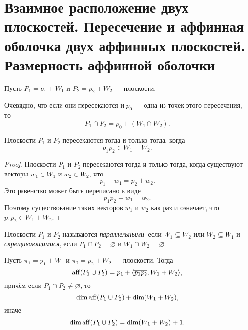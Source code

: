 \section{Взаимное расположение двух плоскостей. Пересечение и аффинная оболочка двух
аффинных плоскостей. Размерность аффинной оболочки}

Пусть $P_1 = p_1 + W_1$ и $P_2 = p_2 + W_2$ --- плоскости.

Очевидно, что если они пересекаются и $p_0$ --- одна из точек этого пересечения, то
\[
    P_1 \cap P_2 = p_0 + (W_1 \cap W_2).
\]

\begin{theorem}
    Плоскости $P_1$ и $P_2$ пересекаются тогда и только тогда, когда
    \[
        \overline{p_1p_2} \in W_1 + W_2.
    \]
\end{theorem}

\begin{proof}
    Плоскости $P_1$ и $P_2$ пересекаются тогда и только тогда, когда существуют векторы $w_1 \in W_1$ и $w_2 \in W_2$, что
    \[
        p_1 + w_1 = p_2 + w_2.
    \]
    Это равенство может быть переписано в виде
    \[
        \overline{p_1p_2} = w_1 - w_2.
    \]
    Поэтому существование таких векторов $w_1$ и $w_2$ как раз и означает, что $\overline{p_1p_2} \in W_1 + W_2$.
\end{proof}

\begin{definition}
    Плоскости $P_1$ и $P_2$ называются \textit{параллельными}, если $W_1 \subseteq W_2$ или $W_2 \subseteq W_1$ и \textit{скрещивающимися}, если $P_1 \cap P_2 = \varnothing$ и $W_1 \cap W_2 = \varnothing$.
\end{definition}

\begin{theorem}
    Пусть $\pi_1 = p_1 + W_1$ и $\pi_2 = p_2 + W_2$ --- плоскости. Тогда
    \[
        \operatorname{aff}(P_1 \cup P_2) = p_1 + \langle\overline{p_1p_2}, W_1 + W_2\rangle,
    \]
    причём если $P_1 \cap P_2 \ne \varnothing$, то
    \[
        \dim\operatorname{aff}(P_1 \cup P_2) + \dim(W_1 + W_2),
    \]
    иначе
    \[
        \dim\operatorname{aff}(P_1 \cup P_2) = \dim(W_1 + W_2) + 1.
    \]
\end{theorem}

